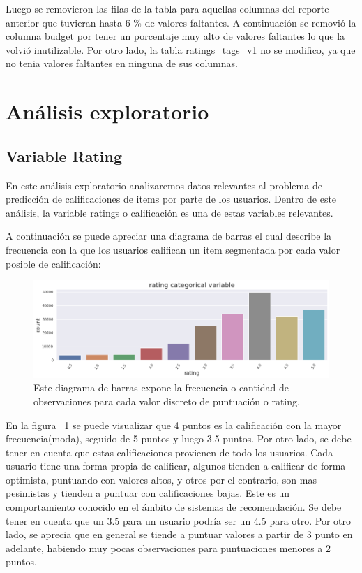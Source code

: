 \documentclass[11pt,a4paper,twoside]{thesis}
\begin{document}
Luego se removieron las filas de la tabla para aquellas columnas del reporte anterior que tuvieran hasta 6 \% de valores faltantes. A continuación se removió la columna budget por tener un porcentaje muy alto de valores faltantes lo que la volvió inutilizable. Por otro lado, la tabla ratings\_tags\_v1 no se modifico, ya que no tenia valores faltantes en ninguna de sus columnas.


\clearpage
\section{Análisis exploratorio}


\subsection{Variable Rating}


En este análisis exploratorio analizaremos datos relevantes al problema de predicción de calificaciones de items por parte de los usuarios. Dentro de este análisis, la variable ratings o calificación es una de estas variables relevantes.

A continuación se puede apreciar una diagrama de barras el cual describe la frecuencia con la que los usuarios califican un item segmentada por cada valor posible de calificación:


\begin{figure}[h!]
	\centering
	\includegraphics[width=15cm]{./images/rating-barplot.png}
	\caption{Este diagrama de barras expone la frecuencia o cantidad de observaciones para cada valor discreto de puntuación o rating.}
	\label{fig:ratingsBarPlot}
\end{figure}

En la figura ~\ref{fig:ratingsBarPlot} se puede visualizar que 4 puntos es la calificación con la mayor frecuencia(moda), seguido de 5 puntos y luego 3.5 puntos. Por otro lado, se debe tener en cuenta que estas calificaciones provienen de todo los usuarios. Cada usuario tiene una forma propia de calificar, algunos tienden a calificar de forma optimista, puntuando con valores altos, y otros por el contrario, son mas pesimistas y tienden a puntuar con calificaciones bajas. Este es un comportamiento conocido en el ámbito de sistemas de recomendación. Se debe tener en cuenta que un 3.5 para un usuario podría ser un 4.5 para otro. Por otro lado, se aprecia que en general se tiende a puntuar valores a partir de 3 punto en adelante, habiendo muy pocas observaciones para puntuaciones menores a 2 puntos.
\end{document}
